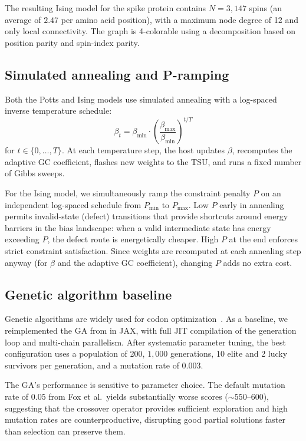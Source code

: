 \documentclass[11pt,twocolumn]{article}
\begin{document}
The resulting Ising model for the spike protein contains $N = 3{,}147$ spins (an average of $2.47$ per amino acid position), with a maximum node degree of 12 and only local connectivity.
The graph is 4-colorable using a decomposition based on position parity and spin-index parity.

\subsection{Simulated annealing and P-ramping}\label{sec:methods_annealing}

Both the Potts and Ising models use simulated annealing with a log-spaced inverse temperature schedule:
\begin{equation}
\beta_t = \beta_\text{min} \cdot \left( \frac{\beta_\text{max}}{\beta_\text{min}} \right)^{t/T}
\end{equation}
for $t \in \{0, \ldots, T\}$.
At each temperature step, the host updates $\beta$, recomputes the adaptive GC coefficient, flashes new weights to the TSU, and runs a fixed number of Gibbs sweeps.

For the Ising model, we simultaneously ramp the constraint penalty $P$ on an independent log-spaced schedule from $P_\text{min}$ to $P_\text{max}$.
Low $P$ early in annealing permits invalid-state (defect) transitions that provide shortcuts around energy barriers in the bias landscape: when a valid intermediate state has energy exceeding $P$, the defect route is energetically cheaper.
High $P$ at the end enforces strict constraint satisfaction.
Since weights are recomputed at each annealing step anyway (for $\beta$ and the adaptive GC coefficient), changing $P$ adds no extra cost.

\subsection{Genetic algorithm baseline}\label{sec:methods_ga}

Genetic algorithms are widely used for codon optimization~\cite{fox2021mrna, sandhu2008gasco}.
As a baseline, we reimplemented the GA from \cite{fox2021mrna} in JAX, with full JIT compilation of the generation loop and multi-chain parallelism.
After systematic parameter tuning, the best configuration uses a population of 200, $1{,}000$ generations, 10 elite and 2 lucky survivors per generation, and a mutation rate of $0.003$.

The GA's performance is sensitive to parameter choice.
The default mutation rate of $0.05$ from Fox et al.\ yields substantially worse scores (${\sim}550$--$600$), suggesting that the crossover operator provides sufficient exploration and high mutation rates are counterproductive, disrupting good partial solutions faster than selection can preserve them.
\end{document}
